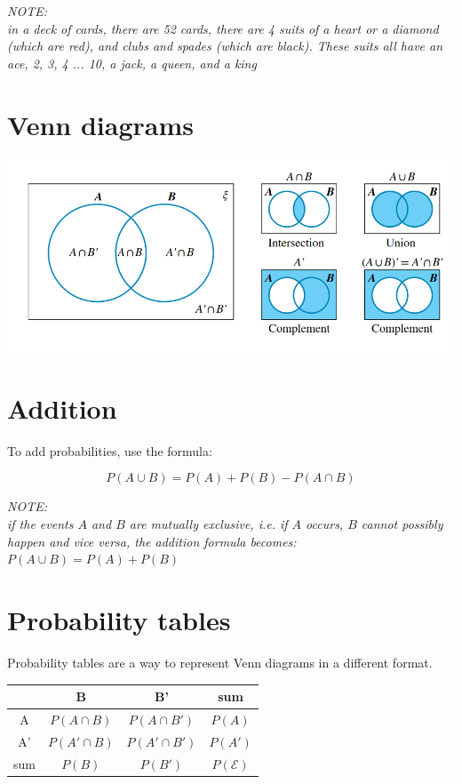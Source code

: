 \documentclass{book}
\newenvironment{note}{\begin{center}\em NOTE:\\}{\end{center}}
\begin{document}
\begin{note}
	in a deck of cards, there are 52 cards, there are 4 suits of a heart or a diamond (which are red), and clubs and spades (which are black).  These suits all have an ace, 2, 3, 4 ... 10, a jack, a queen, and a king
\end{note}



\section{Venn diagrams}
\begin{center}
	\includegraphics[scale=0.5]{venn diagrams}
\end{center}



\section{Addition}
To add probabilities, use the formula:

\[
	P(A \cup B) = P(A) + P(B) - P(A \cap B)
\]

\begin{note}
	if the events $A$ and $B$ are mutually exclusive, i.e. if $A$ occurs, $B$ cannot possibly happen and vice versa, the addition formula becomes: $P(A \cup B) = P(A) + P(B)$
\end{note}



\section{Probability tables}
Probability tables are a way to represent Venn diagrams in a different format.

\begin{center}
	\begin{tabular}{c|c|c|c}
		    & B              & B'              & sum              \\ \hline
		A   & $P(A \cap B)$  & $P(A \cap B')$  & $P(A)$           \\ \hline
		A'  & $P(A' \cap B)$ & $P(A' \cap B')$ & $P(A')$          \\ \hline
		sum & $P(B)$         & $P(B')$         & $P(\mathcal{E})$
	\end{tabular}
\end{center}
\end{document}

